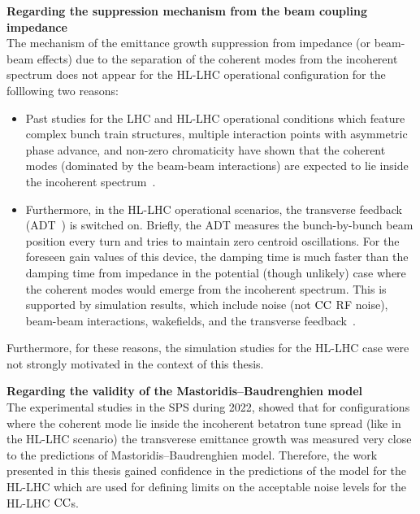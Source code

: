 \textbf{Regarding the suppression mechanism from the beam coupling impedance}\\
The mechanism of the emittance growth suppression from impedance (or beam-beam effects) due to the separation of the coherent modes from the incoherent spectrum does not appear for the HL-LHC operational configuration for the folllowing two reasons:
\begin{itemize}
   \item Past studies for the LHC and HL-LHC operational conditions which feature complex bunch train structures, multiple interaction points with asymmetric phase advance, and non-zero chromaticity have shown that the coherent modes (dominated by the beam-beam interactions) are expected to lie inside the incoherent spectrum~\cite{Pieloni:1259906, Buffat:2712068}.
   \item Furthermore, in the HL-LHC operational scenarios, the transverse feedback (ADT~\cite{lhc_adt_info_presentation}) is switched on. Briefly, the ADT measures the bunch-by-bunch beam position every turn and tries to maintain zero centroid oscillations. For the foreseen gain values of this device, the damping time is much faster than the damping time from impedance in the potential (though unlikely) case where the coherent modes would emerge from the incoherent spectrum. This is supported by simulation results, which include noise (not ${\mathrm{CC}}$ RF noise), beam-beam interactions, wakefields, and the transverse feedback~\cite{Buffat:2712068}.
\end{itemize}

Furthermore, for these reasons, the simulation studies for the HL-LHC case were not strongly motivated in the context of this thesis.

\textbf{Regarding the validity of the Mastoridis--Baudrenghien model}\\
The experimental studies in the SPS during 2022, showed that for configurations where the coherent mode lie inside the incoherent betatron tune spread (like in the HL-LHC scenario) the transverese emittance growth was measured very close to the predictions of Mastoridis--Baudrenghien model. Therefore, the work presented in this thesis gained confidence in the predictions of the model for the HL-LHC which are used for defining limits on the acceptable noise levels for the HL-LHC ${\mathrm{CC}}$s.






